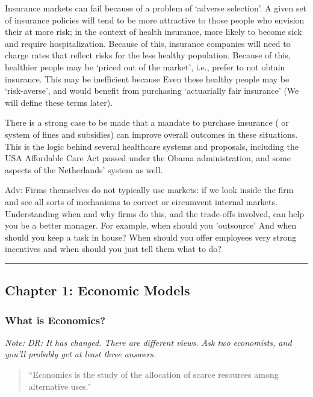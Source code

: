 \documentclass[]{article}
\begin{document}
Insurance markets can fail because of a problem of `adverse selection'. A given set of insurance policies will tend to be more attractive to those people who envision their at more risk; in the context of health insurance, more likely to become sick and require hospitalization. Because of this, insurance companies will need to charge rates that reflect risks for the less healthy population. Because of this, healthier people may be `priced out of the market', i.e., prefer to not obtain insurance. This may be inefficient because Even these healthy people may be `risk-averse', and would benefit from purchasing `actuarially fair insurance' (We will define these terms later).

There is a strong case to be made that a mandate to purchase insurance ( or system of fines and subsidies) can improve overall outcomes in these situations. This is the logic behind several healthcare systems and proposals, including the USA Affordable Care Act passed under the Obama administration, and some aspects of the Netherlands' system as well.

\textcolor{RawSienna}{Adv: Firms themselves do not typically use markets: if we look inside the firm and see all sorts of mechanisms to correct or circumvent internal markets. Understanding when and why firms do this, and the trade-offs involved, can help you be a better manager. For example, when should you 'outsource' And when should you keep a task in house? When should you offer employees very strong incentives and when should you just tell them what to do?}

\begin{center}\rule{0.5\linewidth}{\linethickness}\end{center}

\hypertarget{chapter-1-economic-models}{%
\subsection{Chapter 1: Economic Models}\label{chapter-1-economic-models}}

\hypertarget{what-is-economics}{%
\subsubsection{What is Economics?}\label{what-is-economics}}

\emph{Note: DR: It has changed. There are different views. Ask two economists, and you'll probably get at least three answers.}

\begin{quote}
``Economics is the study of the allocation of scarce resources among alternative uses.''
\end{quote}
\end{document}
